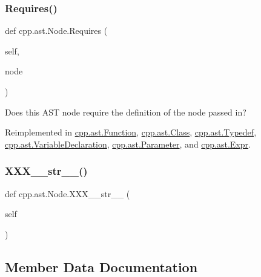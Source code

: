 \subsubsection{\texorpdfstring{Requires()}{Requires()}}
{\footnotesize\ttfamily def cpp.\+ast.\+Node.\+Requires (\begin{DoxyParamCaption}\item[{}]{self,  }\item[{}]{node }\end{DoxyParamCaption})}

\begin{DoxyVerb}Does this AST node require the definition of the node passed in?\end{DoxyVerb}
 

Reimplemented in \mbox{\hyperlink{classcpp_1_1ast_1_1Function_a999e7b5e43517cd4d68b1aeea8a7d6e1}{cpp.\+ast.\+Function}}, \mbox{\hyperlink{classcpp_1_1ast_1_1Class_a347673e0a2a7b840b7d2d1cae13977f7}{cpp.\+ast.\+Class}}, \mbox{\hyperlink{classcpp_1_1ast_1_1Typedef_aa9f65f4a97ba340f2c9ebc5e7ce27e8c}{cpp.\+ast.\+Typedef}}, \mbox{\hyperlink{classcpp_1_1ast_1_1VariableDeclaration_aaa1cae7cf191e6d561d861cd053a0bf4}{cpp.\+ast.\+Variable\+Declaration}}, \mbox{\hyperlink{classcpp_1_1ast_1_1Parameter_a4bc5c17a0d606d35be40cb4c2c1a67a6}{cpp.\+ast.\+Parameter}}, and \mbox{\hyperlink{classcpp_1_1ast_1_1Expr_a9c92416eb1285068f190dcda8fd33682}{cpp.\+ast.\+Expr}}.

\mbox{\label{classcpp_1_1ast_1_1Node_ab5dfeabcbcd7c1f5feb8522edffb8b4a}} 
\subsubsection{\texorpdfstring{XXX\_\_str\_\_()}{XXX\_\_str\_\_()}}
{\footnotesize\ttfamily def cpp.\+ast.\+Node.\+X\+X\+X\+\_\+\+\_\+str\+\_\+\+\_\+ (\begin{DoxyParamCaption}\item[{}]{self }\end{DoxyParamCaption})}



\subsection{Member Data Documentation}
\mbox{\label{classcpp_1_1ast_1_1Node_a3c5e5246ccf619df28eca02e29d69647}} 
